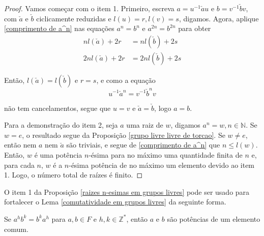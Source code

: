     	\begin{proof} 
        	Vamos começar com o item 1. Primeiro, escreva $a = u^{-1}\check{a}u$ e 
        	$b = v^{-1}\check{b}v$, com $\check{a}$ e $\check{b}$ ciclicamente reduzidas e $l(u) = r, l(v) = s$,
        	digamos. Agora, aplique \eqref{comprimento de a^n} nas equações $a^n = b^n$ e $a^{2n} = b^{2n}$ para 
        	obter
    		\begin{align*}
    		    nl(\check{a}) + 2r &= nl(\check{b}) + 2s \\
    		    2nl(\check{a}) + 2r &= 2nl(\check{b}) + 2s
    		\end{align*}
    		\par\vspace{0.3cm} Então, $l(\check{a}) = l(\check{b})$ e $r=s$, e como a equação
    		\begin{equation*}
    		    u^{-1}\check{a}^n = v^{-1}\check{b}^nv
    		\end{equation*}
    		\par\vspace{0.3cm} não tem cancelamentos, segue que $u = v$ e $\check{a} = \check{b}$, logo $a=b$.
    		
    		\par\vspace{0.3cm} Para a demonstração do item 2, seja $a$ uma raiz de $w$, digamos 
    		$a^n = w, n\in\mathbb{N}$. Se $w = e$, o resultado segue da 
    		Proposição \eqref{grupo livre livre de torcao}. Se $w\neq e$, então nem $a$ nem $\check{a}$ 
    		são triviais, e segue de \eqref{comprimento de a^n} que $n\leq l(w)$. Então, $w$ é uma potência
    		$n$-ésima para no máximo uma quantidade finita de $n$ e, para cada $n$, $w$ é a $n$-ésima 
    		potência de no máximo um elemento devido ao item 1. Logo, o número total de raízes é finito.
    	\end{proof}
    	\par\vspace{0.3cm} O item 1 da Proposição \eqref{raizes n-esimas em grupos livres} pode ser 
    	usado para fortalecer o Lema \eqref{comutatividade em grupos livres} da seguinte forma.
    	\begin{lemma}
    	\label{comutatividade fortalecida em grupos livres}
    		Se $a^hb^k = b^ka^h$ para $a,b\in F$ e $h,k\in\mathbb{Z}^\ast$, então $a$ e $b$ são potências 
    		de um elemento comum.
    	\end{lemma}
